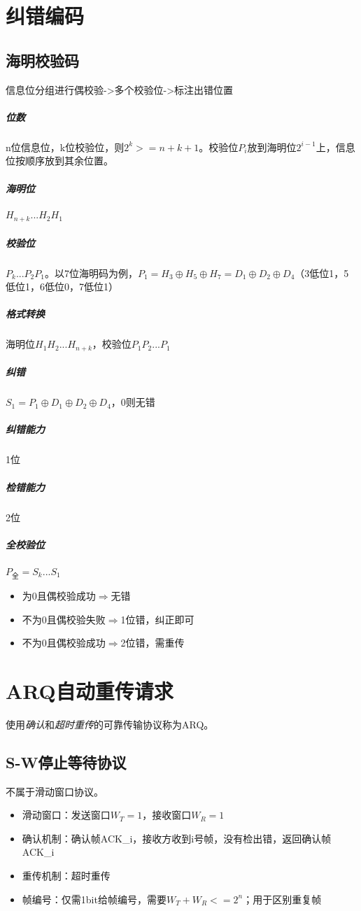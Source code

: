 \section{纠错编码}\label{纠错编码}

\subsection{海明校验码}
信息位分组进行偶校验->多个校验位->标注出错位置
\subparagraph{位数}
n位信息位，k位校验位，则\(2^k >= n + k + 1\)。校验位\(P_i\)放到海明位\(2^{i - 1}\)上，信息位按顺序放到其余位置。
\subparagraph{海明位}
\(H_{n + k} ...H_2 H_1\)
\subparagraph{校验位}
\(P_k...P_2P_1\)。以7位海明码为例，\(P_1 = H_3 \oplus H_5 \oplus H_7 = D_1 \oplus D_2 \oplus D_4\)（3低位1，5低位1，6低位0，7低位1）
\subparagraph{格式转换}
海明位\(H_1H_2...H_{n + k}\)，校验位\(P_1P_2...P_1\)
\subparagraph{纠错}
\(S_1 = P_1 \oplus D_1 \oplus D_2 \oplus D_4\)，0则无错
\subparagraph{纠错能力}
1位
\subparagraph{检错能力}
2位

\subparagraph{全校验位}
\(P_{\text{全}} = S_k...S_1\)\begin{itemize}
    \item 为0且偶校验成功\(\Rightarrow\)无错
    \item 不为0且偶校验失败\(\Rightarrow\)1位错，纠正即可
    \item 不为0且偶校验成功\(\Rightarrow\)2位错，需重传
\end{itemize}


\section{ARQ自动重传请求}\label{ARQ}
使用\textit{确认}和\textit{超时重传}的可靠传输协议称为ARQ。

\subsection{S-W停止等待协议}
不属于滑动窗口协议。
\begin{itemize}
    \item 滑动窗口：发送窗口\(W_T = 1\)，接收窗口\(W_R = 1\)
    \item 确认机制：确认帧ACK\_i，接收方收到i号帧，没有检出错，返回确认帧ACK\_i
    \item 重传机制：超时重传
    \item 帧编号：仅需1bit给帧编号，需要\(W_T + W_R <= 2^n\)；用于区别重复帧
\end{itemize}

